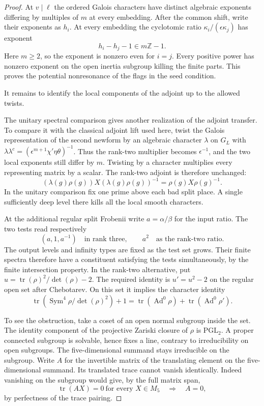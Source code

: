 \begin{proof}
At \(v\mid\ell\) the ordered Galois characters have distinct
algebraic exponents differing by multiples of \(m\) at every
embedding. After the common shift, write their exponents as \(h_i\).
At every embedding the cyclotomic ratio
\(\kappa_i/(\epsilon\kappa_j)\) has exponent
\[
                       h_i-h_j-1\in m\mathbb Z-1 .
\]
Here \(m\ge2\), so the exponent is nonzero even for \(i=j\).
Every positive power has nonzero exponent on the open
inertia subgroup killing the finite parts. This proves the potential
nonresonance of the flags in the seed condition.

It remains to identify the local components of the adjoint up to the allowed twists.

The unitary spectral comparison gives another realization of the adjoint transfer. To compare it with the classical adjoint lift used here, twist the Galois representation of the second newform by an algebraic character
\(\lambda\) on \(G_L\) with
\(\lambda\lambda^c=(\epsilon^{m+1}\chi'\eta\theta)^{-1}\).
Thus the rank-two multiplier becomes \(\epsilon^{-1}\), and
the two local exponents still differ by \(m\). Twisting by a character multiplies every representing matrix by a scalar. The rank-two adjoint is therefore unchanged:
\[
 (\lambda(g)\rho(g))X(\lambda(g)\rho(g))^{-1}=\rho(g)X\rho(g)^{-1}.
\] In the unitary comparison fix one
prime above each bad split place. A single sufficiently deep
level there kills all the local smooth characters.

At the additional regular split Frobenii write \(a=\alpha/\beta\) for the input ratio. The two tests read respectively
\[
 (a,1,a^{-1})\quad\text{in rank three},\qquad a^2\quad\text{as the rank-two ratio}.
\]
The output levels and infinity types are fixed as the test
set grows. Their finite spectra therefore have a constituent
satisfying the tests simultaneously, by the finite intersection
property. In the rank-two alternative, put
\(u=\operatorname{tr}(\rho)^2/\det(\rho)-2\). The required
identity is \(u'=u^2-2\) on the regular open set after
Chebotarev. On this set it implies the character identity
\[
 \operatorname{tr}(\operatorname{Sym}^4\rho/\det(\rho)^2)+1
 =\operatorname{tr}(\operatorname{Ad}^0\rho)
    +\operatorname{tr}(\operatorname{Ad}^0\rho').
\]

To see the obstruction, take a coset of an open normal subgroup
inside the set. The identity component of the projective
Zariski closure of \(\rho\) is \(\mathrm{PGL}_2\). A proper
connected subgroup is solvable, hence fixes a line, contrary
to irreducibility on open subgroups. The five-dimensional
summand stays irreducible on the subgroup. Write \(A\) for the invertible matrix of the translating element on the five-dimensional summand. Its translated trace cannot vanish identically. Indeed vanishing on the subgroup would give, by the full matrix span,
\[
 \operatorname{tr}(AX)=0\ \text{for every }X\in M_5\quad\Longrightarrow\quad A=0,
\]
by perfectness of the trace pairing.


\end{proof}
